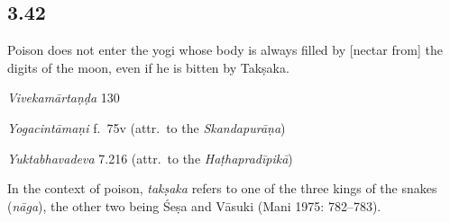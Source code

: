 \begin{ekdosis}

\subsection*{3.42}
\begin{translation}[hp03_042]
Poison does not enter the yogi whose body is always filled by [nectar from] the digits of the moon, even if he is bitten by Takṣaka.
\end{translation}

\begin{sources}[hp03_042]
\emph{Vivekamārtaṇḍa} 130
\begin{versinnote}
\tl{\var{pīḍayet ] pīḍyate, sarpati, bādhyate \vl}\\!}
\end{versinnote}
\end{sources}

\begin{testimonia}[hp03_042]
\emph{Yogacintāmaṇi} f.~75v (attr.~to the \emph{Skandapurāṇa})
\begin{versinnote}
\end{versinnote}

\emph{Yuktabhavadeva} 7.216 (attr.~to the \emph{Haṭhapradīpikā})
\begin{versinnote}
\end{versinnote}
\end{testimonia}

\begin{philcomm}[hp03_042]
In the context of poison, \emph{takṣaka} refers to one of the three kings of the snakes (\emph{nāga}), the other two being Śeṣa and Vāsuki (Mani 1975: 782–783).\lb %


\end{philcomm}
\end{ekdosis}
